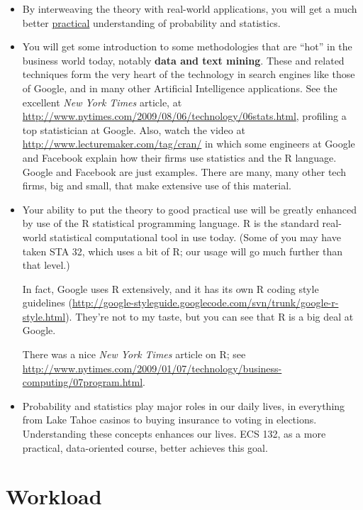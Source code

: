 \begin{itemize}

\item By interweaving the theory with real-world applications, you will
get a much better \underline{practical} understanding of probability
and statistics.

\item You will get some introduction to some methodologies that are
``hot'' in the business world today, notably {\bf data and text mining}.
These and related techniques form the very heart of the technology in
search engines like those of Google, and in many other Artificial
Intelligence applications.  See the excellent {\it New York Times}
article, at
\url{http://www.nytimes.com/2009/08/06/technology/06stats.html},
profiling a top statistician at Google.  Also, watch the video at
\url{http://www.lecturemaker.com/tag/cran/} in which some engineers at
Google and Facebook explain how their firms use statistics and the R
language.  Google and Facebook are just examples.  There are many, many
other tech firms, big and small, that make extensive use of this
material.

\item Your ability to put the theory to good practical use will be
greatly enhanced by use of the R statistical programming language.  R
is the standard real-world statistical computational tool in use today.
(Some of you may have taken STA 32, which uses a bit of R; our usage
will go much further than that level.)

In fact, Google uses R extensively, and it has its own R coding style
guidelines
(\url{http://google-styleguide.googlecode.com/svn/trunk/google-r-style.html}).
They're not to my taste, but you can see that R is a big deal at Google.

There was a nice {\it New York Times} article on R; see
\url{http://www.nytimes.com/2009/01/07/technology/business-computing/07program.html}.

\item Probability and statistics play major roles in our daily lives, in
everything from Lake Tahoe casinos to buying insurance to voting in
elections.  Understanding these concepts enhances our lives.  ECS 132,
as a more practical, data-oriented course, better achieves this goal.

\end{itemize}

\section{Workload}

